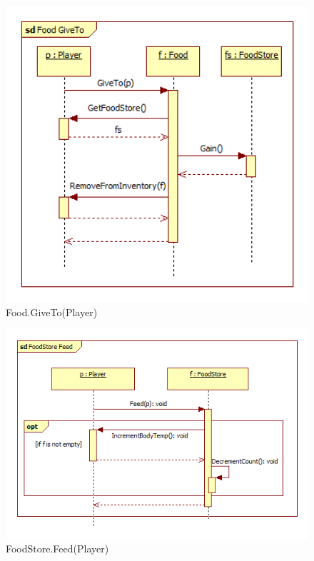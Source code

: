 \begin{figure}[H]
	\begin{center}
		\includegraphics[width=15cm]{chapters/chapter04/seqdiag/Food_GiveTo.png}
		\caption{Food.GiveTo(Player)}
		\label{fig:FoodGiveTo}
	\end{center}
\end{figure}
\begin{figure}[H]
	\begin{center}
		\includegraphics[width=12cm]{chapters/chapter04/seqdiag/FoodStore_Feed.png}
		\caption{FoodStore.Feed(Player)}
		\label{fig:FoodStoreFeed}
	\end{center}
\end{figure}
